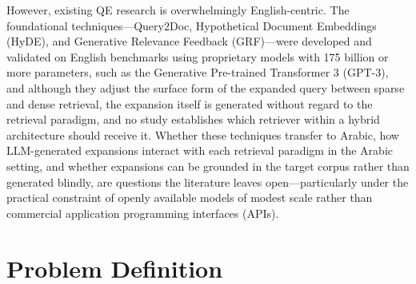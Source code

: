 However, existing QE research is overwhelmingly English-centric. The foundational techniques---Query2Doc, Hypothetical Document Embeddings (HyDE), and Generative Relevance Feedback (GRF)---were developed and validated on English benchmarks using proprietary models with 175 billion or more parameters, such as the Generative Pre-trained Transformer 3 (GPT-3), and although they adjust the surface form of the expanded query between sparse and dense retrieval, the expansion itself is generated without regard to the retrieval paradigm, and no study establishes which retriever within a hybrid architecture should receive it. Whether these techniques transfer to Arabic, how LLM-generated expansions interact with each retrieval paradigm in the Arabic setting, and whether expansions can be grounded in the target corpus rather than generated blindly, are questions the literature leaves open---particularly under the practical constraint of openly available models of modest scale rather than commercial application programming interfaces (APIs).

\section{Problem Definition}
\label{sec:problem_definition}

